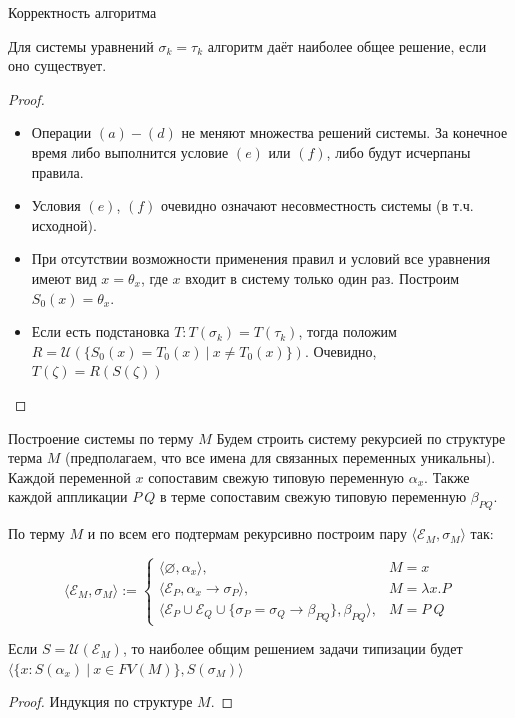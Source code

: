 \documentclass[aspectratio=169]{beamer}
\begin{document}
\begin{frame}{Корректность алгоритма}
\begin{thm}Для системы уравнений $\sigma_k = \tau_k$ алгоритм даёт наиболее общее решение, если оно существует.\end{thm}
\begin{proof}
\begin{itemize}
\item Операции $(a)-(d)$ не меняют множества решений системы. За конечное время либо выполнится условие $(e)$ или $(f)$,
либо будут исчерпаны правила.
\item Условия $(e)$, $(f)$ очевидно означают несовместность системы (в т.ч. исходной).
\item При отсутствии возможности применения правил и условий все уравнения имеют вид $x = \theta_x$,
где $x$ входит в систему только один раз. Построим $S_0(x) = \theta_x$. 

\item Если есть подстановка $T: T(\sigma_k) = T(\tau_k)$, тогда положим $R = \mathcal{U}(\{ S_0(x) = T_0(x)\ |\ x \ne T_0(x)\})$.
Очевидно, $T(\zeta) = R(S(\zeta))$
\end{itemize}
\end{proof}
\end{frame}

\begin{frame}{Построение системы по терму $M$}
Будем строить систему рекурсией по структуре терма $M$ (предполагаем, что все имена
для связанных переменных уникальны). 
Каждой переменной $x$ сопоставим свежую типовую переменную $\alpha_x$. Также каждой аппликации $P\ Q$ в терме сопоставим
свежую типовую переменную $\beta_{PQ}$. 


По терму $M$ и по всем его подтермам рекурсивно построим пару $\langle \mathcal{E}_M, \sigma_M\rangle$ так:


$$\langle\mathcal{E}_M,\sigma_M\rangle := \left\{\begin{array}{ll}\langle \varnothing, \alpha_x\rangle, & M = x\\
\langle \mathcal{E}_P, \alpha_x\rightarrow\sigma_P\rangle, & M = \lambda x.P\\
\langle \mathcal{E}_P\cup\mathcal{E}_Q\cup\{\sigma_P = \sigma_Q\rightarrow\beta_{PQ}\}, \beta_{PQ}\rangle, 
   & M = P\ Q
\end{array}\right.$$

\begin{thm} Если $S = \mathcal{U}(\mathcal{E}_M)$, то наиболее общим решением задачи типизации будет
$\langle\{ x : S(\alpha_x)\ |\ x \in FV(M) \}, S(\sigma_M)\rangle$\end{thm}
\begin{proof} Индукция по структуре $M$. \end{proof}
\end{frame}
\end{document}
